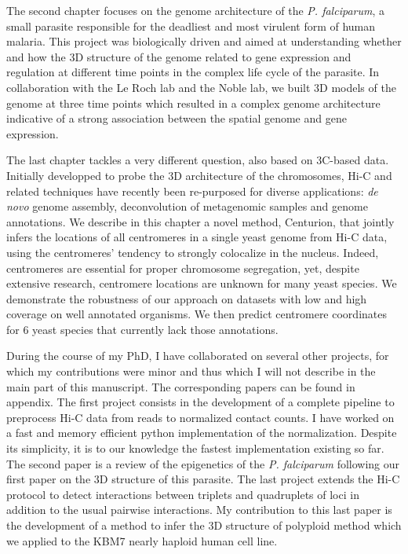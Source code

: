 \begin{abstracts}
The second chapter focuses on the genome architecture of the {\em P.
falciparum}, a small parasite responsible for the deadliest and most virulent
form of human malaria. This project was biologically driven and aimed at
understanding whether and how the 3D structure of the genome related to gene
expression and regulation at different time points in the complex life cycle
of the parasite. In collaboration with the Le Roch lab and the Noble 
lab, we built 3D
models of the genome at three time points which resulted in a complex genome
architecture indicative of a strong association between the spatial genome and
gene expression.

The last chapter tackles a very different question, also based on 3C-based
data. Initially developped to probe the 3D architecture of the chromosomes,
Hi-C and related techniques have recently been re-purposed for diverse
applications: \textit{de novo} genome assembly, deconvolution of metagenomic
samples and genome annotations. We describe in this chapter a novel method,
Centurion, that jointly infers the locations of all centromeres in a single yeast
genome from Hi-C data, using the centromeres' tendency to strongly colocalize
in the nucleus.  Indeed, centromeres are essential for proper chromosome
segregation, yet, despite extensive research, centromere locations are unknown
for many yeast species. We demonstrate the robustness of our approach on
datasets with low and high coverage on well annotated organisms. We then
predict centromere coordinates for 6 yeast species that currently lack those
annotations.

During the course of my PhD, I have collaborated on several other projects,
for which my contributions were minor and thus which I will not describe in the
main part of this manuscript. The corresponding papers can be found in
appendix. The first project consists in the development of a complete pipeline
to preprocess Hi-C data from reads to normalized contact counts. I have worked
on a fast and memory efficient python implementation of the normalization.
Despite its simplicity, it is to our
knowledge the fastest implementation existing so far. The second paper is a
review of the epigenetics of the {\em P. falciparum} following our first paper
on the 3D structure of this parasite. The last project extends the Hi-C
protocol to detect interactions between triplets and quadruplets of loci in
addition to the usual pairwise interactions. My contribution to this last paper
is the development of a method to infer the 3D structure of polyploid method
which we applied to the KBM7 nearly haploid human cell line.


\end{abstracts}



